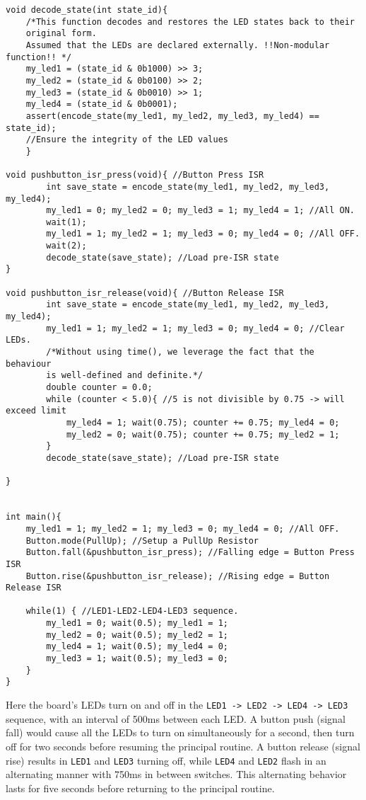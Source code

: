 \documentclass{article}
\begin{document}
\begin{verbatim}
void decode_state(int state_id){
    /*This function decodes and restores the LED states back to their
    original form.
    Assumed that the LEDs are declared externally. !!Non-modular function!! */
    my_led1 = (state_id & 0b1000) >> 3;
    my_led2 = (state_id & 0b0100) >> 2;
    my_led3 = (state_id & 0b0010) >> 1;
    my_led4 = (state_id & 0b0001);
    assert(encode_state(my_led1, my_led2, my_led3, my_led4) == state_id);
    //Ensure the integrity of the LED values
    }

void pushbutton_isr_press(void){ //Button Press ISR
        int save_state = encode_state(my_led1, my_led2, my_led3, my_led4);
        my_led1 = 0; my_led2 = 0; my_led3 = 1; my_led4 = 1; //All ON.
        wait(1);
        my_led1 = 1; my_led2 = 1; my_led3 = 0; my_led4 = 0; //All OFF.
        wait(2);
        decode_state(save_state); //Load pre-ISR state
}

void pushbutton_isr_release(void){ //Button Release ISR
        int save_state = encode_state(my_led1, my_led2, my_led3, my_led4);
        my_led1 = 1; my_led2 = 1; my_led3 = 0; my_led4 = 0; //Clear LEDs.
        /*Without using time(), we leverage the fact that the behaviour
        is well-defined and definite.*/
        double counter = 0.0;
        while (counter < 5.0){ //5 is not divisible by 0.75 -> will exceed limit
            my_led4 = 1; wait(0.75); counter += 0.75; my_led4 = 0;
            my_led2 = 0; wait(0.75); counter += 0.75; my_led2 = 1;
        }
        decode_state(save_state); //Load pre-ISR state
       
}


int main(){
    my_led1 = 1; my_led2 = 1; my_led3 = 0; my_led4 = 0; //All OFF.
    Button.mode(PullUp); //Setup a PullUp Resistor
    Button.fall(&pushbutton_isr_press); //Falling edge = Button Press ISR
    Button.rise(&pushbutton_isr_release); //Rising edge = Button Release ISR
    
    while(1) { //LED1-LED2-LED4-LED3 sequence.
        my_led1 = 0; wait(0.5); my_led1 = 1;
        my_led2 = 0; wait(0.5); my_led2 = 1;
        my_led4 = 1; wait(0.5); my_led4 = 0;
        my_led3 = 1; wait(0.5); my_led3 = 0;    
    }
}
\end{verbatim}


Here the board's LEDs turn on and off in the \texttt{LED1 -> LED2 -> LED4 -> LED3} sequence, with an interval of 500ms between each LED. A button push (signal fall) would cause all the LEDs to turn on simultaneously for a second, then turn off for two seconds before resuming the principal routine. A button release (signal rise) results in \texttt{LED1} and \texttt{LED3} turning off, while \texttt{LED4} and \texttt{LED2} flash in an alternating manner with 750ms in between switches. This alternating behavior lasts for five seconds before returning to the principal routine.
\end{document}
